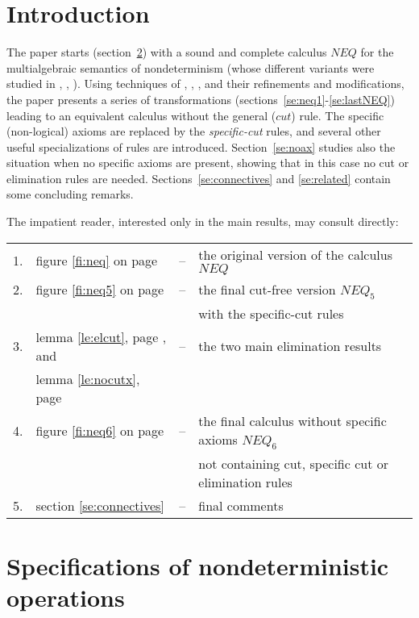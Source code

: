 \section{Introduction}
The paper starts (section~\ref{se:specs}) with a sound and complete calculus $NEQ$ for the
multialgebraic semantics of nondeterminism (whose different variants were studied in 
\cite{Mich}, \cite{WM}, \cite{Top}). Using techniques of \cite{K}, \cite{Aida1}, \cite{Aida2},
and their refinements and modifications, the paper presents a series
of transformations (sections~\ref{se:neq1}-\ref{se:lastNEQ}) leading
to an equivalent calculus without the general ($cut$) rule. The
specific (non-logical) axioms are replaced by the {\em specific-cut}
rules, and several other useful specializations of rules are
introduced. Section~\ref{se:noax} studies also the situation when no specific
axioms are present, showing that in this case no cut or elimination rules are needed.
Sections~\ref{se:connectives} and \ref{se:related} contain some concluding remarks.

The impatient reader, interested only in the main results, may consult directly:\\[1ex]
\begin{tabular}{rlcl}
1. &  figure \ref{fi:neq} on page \pageref{fi:neq} & -- & the original version of
the calculus $NEQ$ \\
2. & figure \ref{fi:neq5} on page \pageref{fi:neq5} & -- & the final cut-free
version $NEQ_5$ \\
 & & & with the specific-cut rules \\
3. & lemma \ref{le:elcut}, page \pageref{le:elcut}, and & -- & the two main elimination results \\
 & lemma \ref{le:nocutx}, page \pageref{le:nocutx} \\
4. & figure \ref{fi:neq6} on page \pageref{fi:neq6} & -- & the final calculus
without specific axioms $NEQ_6$ \\ 
 & & & not containing cut, specific cut or elimination rules \\
5. & section \ref{se:connectives} & -- & final comments
\end{tabular}

\section{Specifications of nondeterministic operations}\label{se:specs}

